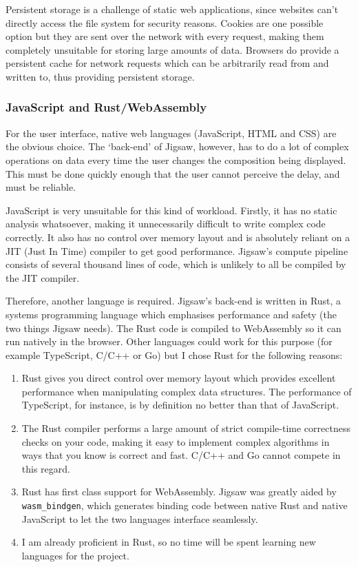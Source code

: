 \documentclass[12pt]{article}
\begin{document}
Persistent storage is a challenge of static web applications, since websites can't directly access
the file system for security reasons.  Cookies are one possible option but they are sent over the
network with every request, making them completely unsuitable for storing large amounts of data.
Browsers do provide a persistent cache for network requests which can be arbitrarily read from and
written to, thus providing persistent storage.

\subsubsection{JavaScript and Rust/WebAssembly}

For the user interface, native web languages (JavaScript, HTML and CSS) are the obvious choice.  The
`back-end' of Jigsaw, however, has to do a lot of complex operations on data every time the user
changes the composition being displayed.  This must be done quickly enough that the user cannot
perceive the delay, and must be reliable.

JavaScript is very unsuitable for this kind of workload.  Firstly, it has no static analysis
whatsoever, making it unnecessarily difficult to write complex code correctly.  It also has no
control over memory layout and is absolutely reliant on a JIT (Just In Time) compiler to get good
performance.  Jigsaw's compute pipeline consists of several thousand lines of code, which is
unlikely to all be compiled by the JIT compiler.


Therefore, another language is required.  Jigsaw's back-end is written in Rust, a systems
programming language which emphasises performance and safety (the two things Jigsaw needs).  The
Rust code is compiled to WebAssembly so it can run natively in the browser.  Other languages could
work for this purpose (for example TypeScript, C/C++ or Go) but I chose Rust for the following
reasons:

\begin{enumerate}
    \item Rust gives you direct control over memory layout which provides excellent performance when
        manipulating complex data structures.  The performance of TypeScript, for instance, is by
        definition no better than that of JavaScript.
    \item The Rust compiler performs a large amount of strict compile-time correctness checks on
        your code, making it easy to implement complex algorithms in ways that you know is correct
        and fast.  C/C++ and Go cannot compete in this regard.
    \item Rust has first class support for WebAssembly.  Jigsaw was greatly aided by
        \verb|wasm_bindgen|, which generates binding code between native Rust and native JavaScript
        to let the two languages interface seamlessly.
    \item I am already proficient in Rust, so no time will be spent learning new languages for the
        project.
\end{enumerate}
\end{document}
